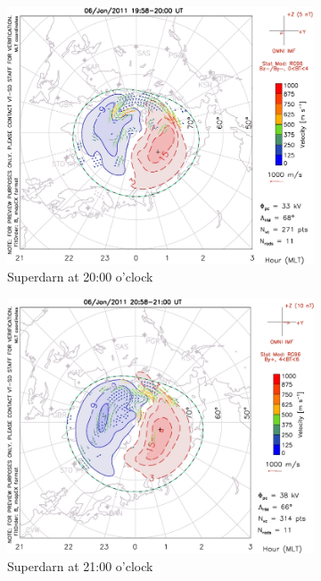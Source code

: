 \documentclass[10pt,a4paper]{article}
\begin{document}
\begin{figure}[h]
\begin{subfigure}{0.3\textwidth}
\centering
	\includegraphics[width=\textwidth]{Superdarn3.jpg}
	\caption{ Superdarn at 20:00 o'clock \label{Super_20}}
\end{subfigure}
\begin{subfigure}{0.3\textwidth}
\centering
	\includegraphics[width=\textwidth]{Superdarn4.jpg}
	\caption{ Superdarn at 21:00 o'clock \label{Super_21}}
\end{subfigure}
\begin{subfigure}{0.3\textwidth}

\end{subfigure}
\end{figure}
\end{document}
